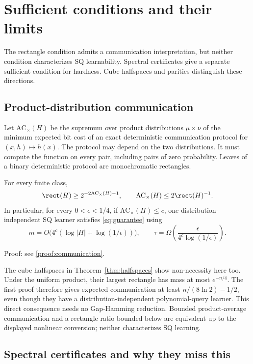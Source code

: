 \section{Sufficient conditions and their limits}\label{sec:characterizations}
The rectangle condition admits a communication interpretation, but neither condition characterizes SQ learnability. Spectral certificates give a separate sufficient condition for hardness. Cube halfspaces and parities distinguish these directions.
\subsection{Product-distribution communication}\label{sec:communication}
Let $\mathrm{AC}_{\times}(H)$ be the supremum over product distributions $\mu\times\nu$ of the minimum expected bit cost of an exact deterministic communication protocol for $(x,h)\mapsto h(x)$. The protocol may depend on the two distributions. It must compute the function on every pair, including pairs of zero probability. Leaves of a binary deterministic protocol are monochromatic rectangles.


\begin{theorem}\label{thm:communication}
For every finite class,
\[
 \rect(H)\ge2^{-2\mathrm{AC}_{\times}(H)-1},
 \qquad
 \mathrm{AC}_{\times}(H)\le2\rect(H)^{-1}.
\]
In particular, for every $0<\epsilon<1/4$, if $\mathrm{AC}_{\times}(H)\le c$, one distribution-independent SQ learner satisfies \eqref{eq:guarantee} using
\[
 m=O\bigl(4^c(\log|H|+\log(1/\epsilon))\bigr),\qquad
 \tau=\Omega\!\left(\frac{\epsilon}{4^c\log(1/\epsilon)}\right).
\]
\end{theorem}

\noindent Proof: see \cref{proof:communication}.\par


The cube halfspaces in Theorem~\ref{thm:halfspaces} show non-necessity here too. Under the uniform product, their largest rectangle has mass at most $e^{-n/4}$. The first proof therefore gives expected communication at least $n/(8\ln2)-1/2$, even though they have a distribution-independent polynomial-query learner. This direct consequence needs no Gap-Hamming reduction. Bounded product-average communication and a rectangle ratio bounded below are equivalent up to the displayed nonlinear conversion; neither characterizes SQ learning.

\subsection{Spectral certificates and why they miss this}\label{sec:retained}

